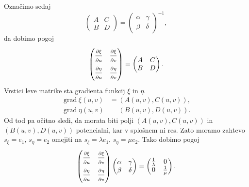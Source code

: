 Označimo sedaj \begin{equation*}
\begin{pmatrix}
A & C \\
B & D
\end{pmatrix} = \begin{pmatrix}
  \alpha & \gamma \\ \beta & \delta
  \end{pmatrix}^{-1},
\end{equation*}  
da dobimo pogoj 
\begin{equation*}
  \begin{pmatrix}
    \frac{ \strut\partial \xi }{ \strut\partial u }  & \frac{ \strut\partial \xi }{ \strut\partial v }  \\
    \frac{ \strut\partial \eta }{ \strut\partial u }  & \frac{ \strut\partial \eta }{ \strut\partial v } 
    \end{pmatrix} = \begin{pmatrix}
      A & C \\
      B & D
      \end{pmatrix}.
\end{equation*}  
Vrstici leve matrike sta gradienta funkcij $\xi$ in $\eta$.\begin{align*}
    \operatorname{grad} \xi (u,v) &= (A(u,v), C(u,v)), \\
    \operatorname{grad} \eta (u,v) &= (B(u,v), D(u,v)).
\end{align*}
Od tod pa očitno sledi, da morata biti polji $(A(u,v), C(u,v))$ in $(B(u,v), D(u,v))$ potencialni, kar v splošnem ni res.
Zato moramo zahtevo $s_{\xi} = e_1$, $s_{\eta} = e_2$ omejiti na $s_{\xi} = \lambda e_1$, $s_{\eta} = \mu e_2$.
Tako dobimo pogoj \begin{equation*}
  \begin{pmatrix}
    \frac{ \strut\partial \xi }{ \strut\partial u }  & \frac{ \strut\partial \xi }{ \strut\partial v }  \\
    \frac{ \strut\partial \eta }{ \strut\partial u }  & \frac{ \strut\partial \eta }{ \strut\partial v } 
    \end{pmatrix} \begin{pmatrix}
      \alpha & \gamma \\ \beta & \delta
      \end{pmatrix} = \begin{pmatrix}
        \frac{1}{\lambda} & 0  \\ 0 & \frac{1}{\mu}
        \end{pmatrix}.
\end{equation*}  

